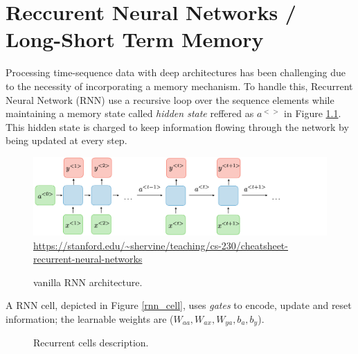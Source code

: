 \documentclass[12pt, a4paper]{report}
\begin{document}
	\chapter{Reccurent Neural Networks / Long-Short Term Memory}\label{appendix_b}
		Processing time-sequence data with deep architectures has been challenging due to the necessity of incorporating a memory mechanism.
		To handle this, Recurrent Neural Network (RNN) use a recursive loop over the sequence elements while maintaining a memory state called {\itshape hidden state} reffered as {\itshape $a^{<>}$} in Figure \ref{rnn}.
		This hidden state is charged to keep information flowing through the network by being updated at every step.
		\begin{figure}[h!]
			\centering
			\includegraphics[width=1.\textwidth]{architecture-rnn-ltr.png}
			{\tiny \url{https://stanford.edu/~shervine/teaching/cs-230/cheatsheet-recurrent-neural-networks}}
			\caption{vanilla RNN architecture.}
			\label{rnn}
		\end{figure}
		A RNN cell, depicted in Figure \ref{rnn_cell}, uses {\itshape gates} to encode, update and reset information; the learnable weights are ({\itshape $W_{aa},W_{ax},W_{ya},b_{a},b_{y}$}).
		\begin{figure}[h!]
			\centering
			\hfill
			\caption{Recurrent cells description.}
		\end{figure}
\end{document}

